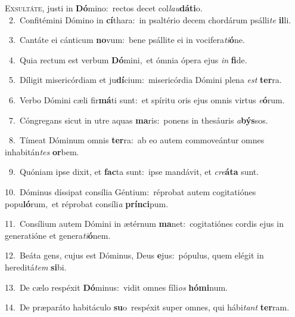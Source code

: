 \lettrine{\initial\textcolor{\initialcolor}{E}}{xsultáte,} justi in \textbf{Dó}\-mino:~\star rectos decet col\-\textit{lau}\-\textbf{dá}\textbf{ti}o.\\
{\numbfont\textcolor{\numbcolor}{~2.}}~Confitémini Dómino in \textbf{cí}\-thara:~\star in psaltério decem chordárum psálli\textit{te} \textbf{il}\-li.\par
{\numbfont\textcolor{\numbcolor}{~3.}}~Cantáte ei cánticum \textbf{no}\-vum:~\star bene psállite ei in vocifera\-\textit{ti}\-\textbf{ó}ne.\par
{\numbfont\textcolor{\numbcolor}{~4.}}~Quia rectum est verbum \textbf{Dó}\-mini,~\star et ómnia ópera ejus \textit{in} \textbf{fi}\-de.\par
{\numbfont\textcolor{\numbcolor}{~5.}}~Díligit misericórdiam et ju\-\textbf{dí}\-cium:~\star misericórdia Dómini plena \textit{est} \textbf{ter}\-ra.\par
{\numbfont\textcolor{\numbcolor}{~6.}}~Verbo Dómini cæli fir\-\textbf{má}\-ti sunt:~\star et spíritu oris ejus omnis virtus \textit{e}\-\textbf{ó}rum.\par
{\numbfont\textcolor{\numbcolor}{~7.}}~Cóngregans sicut in utre aquas \textbf{ma}\-ris:~\star ponens in thesáuris \textit{a}\-\textbf{býs}sos.\par
{\numbfont\textcolor{\numbcolor}{~8.}}~Tímeat Dóminum omnis \textbf{ter}\-ra:~\star ab eo autem commoveántur omnes inhabitán\textit{tes} \textbf{or}\-bem.\par
{\numbfont\textcolor{\numbcolor}{~9.}}~Quóniam ipse dixit, et \textbf{fac}\-ta sunt:~\star ipse mandávit, et \textit{cre}\-\textbf{á}\textbf{ta} sunt.\par
{\numbfont\textcolor{\numbcolor}{10.}}~Dóminus díssipat consília Géntium:~\dagger réprobat autem cogitatiónes popu\-\textbf{ló}\-rum,~\star et réprobat consíli\textit{a} \textbf{prín}\-\textbf{ci}pum.\par
{\numbfont\textcolor{\numbcolor}{11.}}~Consílium autem Dómini in ætérnum \textbf{ma}\-net:~\star cogitatiónes cordis ejus in generatióne et genera\-\textit{ti}\-\textbf{ó}nem.\par
{\numbfont\textcolor{\numbcolor}{12.}}~Beáta gens, cujus est Dóminus, Deus \textbf{e}\-jus:~\star pópulus, quem elégit in hereditá\textit{tem} \textbf{si}\-bi.\par
{\numbfont\textcolor{\numbcolor}{13.}}~De cælo respéxit \textbf{Dó}\-minus:~\star vidit omnes fíli\textit{os} \textbf{hó}\-\textbf{mi}num.\par
{\numbfont\textcolor{\numbcolor}{14.}}~De præparáto habitáculo \textbf{su}\-o~\star respéxit super omnes, qui hábi\textit{tant} \textbf{ter}\-ram.\par
